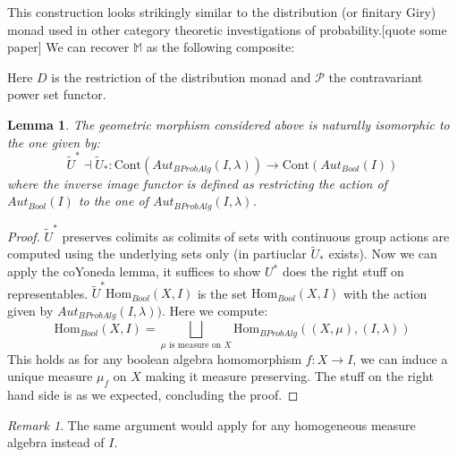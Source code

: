 \documentclass[a4paper]{amsproc}
\theoremstyle{plain}
\newtheorem{lemma}[theorem]{Lemma}
\theoremstyle{definition}
\theoremstyle{remark}
\newtheorem{remark}[theorem]{Remark}
\numberwithin{equation}{section}
\begin{document}
This construction looks strikingly similar to the distribution (or finitary Giry) monad used in other category theoretic investigations of probability.[quote some paper] We can recover $\mathbb{M}$ as the following composite:
\begin{center}
\end{center}
Here $D$ is the restriction of the distribution monad and $\mathcal{P}$ the contravariant power set functor.
\begin{lemma} The geometric morphism considered above is naturally isomorphic to the one given by:
\[\tilde{U}^*\dashv \tilde{U}_*:\text{Cont}(Aut_{BProbAlg}(I,\lambda))\rightarrow\text{Cont}(Aut_{Bool}(I))\]
where the inverse image functor is defined as restricting the action of $Aut_{Bool}(I)$ to the one of $Aut_{BProbAlg}(I,\lambda)$.
\end{lemma}
\begin{proof} 
$\tilde{U}^*$ preserves colimits as colimits of sets with continuous group actions are computed using the underlying sets only (in partiuclar $\tilde{U}_*$ exists).
Now we can apply the coYoneda lemma, it suffices to show $U^*$ does the right stuff on representables.
  $\tilde{U}^*\text{Hom}_{Bool}(X,I)$ is the set 
$\text{Hom}_{Bool}(X,I)$ with the action given by $Aut_{BProbAlg}(I,\lambda))$. Here we compute:
\[\text{Hom}_{Bool}(X,I)=\bigsqcup_{\mu\text{ is measure on }X}\text{Hom}_{BProbAlg}((X,\mu),(I,\lambda))\]
This holds as for any boolean algebra homomorphism $f:X\rightarrow I$, we can induce a unique measure $\mu_f$ on $X$ making it measure preserving. The stuff on the right hand side is as we expected, concluding the proof.
\end{proof}
\begin{remark} The same argument would apply for any homogeneous measure algebra instead of $I$.
\end{remark}
\end{document}

